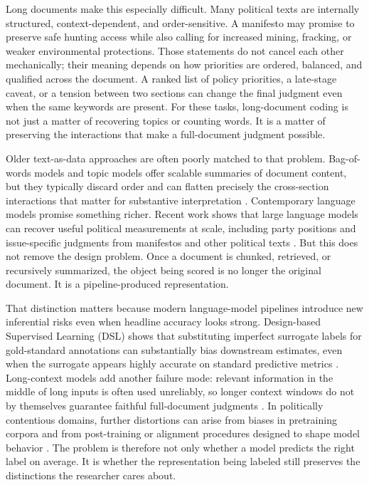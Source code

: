 \documentclass[11pt]{article}
\begin{document}
Long documents make this especially difficult. Many political texts are internally structured, context-dependent, and order-sensitive. A manifesto may promise to preserve safe hunting access while also calling for increased mining, fracking, or weaker environmental protections. Those statements do not cancel each other mechanically; their meaning depends on how priorities are ordered, balanced, and qualified across the document. A ranked list of policy priorities, a late-stage caveat, or a tension between two sections can change the final judgment even when the same keywords are present. For these tasks, long-document coding is not just a matter of recovering topics or counting words. It is a matter of preserving the interactions that make a full-document judgment possible.

Older text-as-data approaches are often poorly matched to that problem. Bag-of-words models and topic models offer scalable summaries of document content, but they typically discard order and can flatten precisely the cross-section interactions that matter for substantive interpretation \citep{blei2003latent,roberts2014structural}. Contemporary language models promise something richer. Recent work shows that large language models can recover useful political measurements at scale, including party positions and issue-specific judgments from manifestos and other political texts \citep{BenoitEtAl2025}. But this does not remove the design problem. Once a document is chunked, retrieved, or recursively summarized, the object being scored is no longer the original document. It is a pipeline-produced representation.

That distinction matters because modern language-model pipelines introduce new inferential risks even when headline accuracy looks strong. Design-based Supervised Learning (DSL) shows that substituting imperfect surrogate labels for gold-standard annotations can substantially bias downstream estimates, even when the surrogate appears highly accurate on standard predictive metrics \citep{EgamiEtAl2024}. Long-context models add another failure mode: relevant information in the middle of long inputs is often used unreliably, so longer context windows do not by themselves guarantee faithful full-document judgments \citep{LiuEtAl2024LostMiddle}. In politically contentious domains, further distortions can arise from biases in pretraining corpora and from post-training or alignment procedures designed to shape model behavior \citep{FengEtAl2023PoliticalBias,OuyangEtAl2022InstructGPT,FulayEtAl2024TruthBias}. The problem is therefore not only whether a model predicts the right label on average. It is whether the representation being labeled still preserves the distinctions the researcher cares about.
\end{document}
